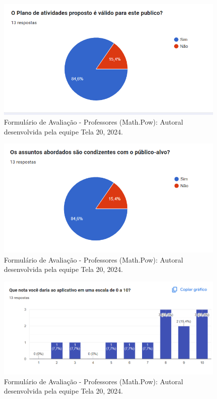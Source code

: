 \documentclass[12pt, openany, oneside, a4paper, english, brazil]{abntex2}   %
\begin{document}
\begin{figure}
    \centering
    \includegraphics{figuras/Formulário Gráficos/Professores/8 O plano de atividades proposto e valido.png}
    \caption{Formulário de Avaliação - Professores (Math.Pow):  Autoral desenvolvida pela equipe Tela 20, 2024.}
    \label{gráfico gerado pelo formulário}
\end{figure}


\begin{figure}
    \centering
    \includegraphics{figuras/Formulário Gráficos/Professores/9 Os assuntos abordados sao condizentes com o publico-alvo.png}
    \caption{Formulário de Avaliação - Professores (Math.Pow):  Autoral desenvolvida pela equipe Tela 20, 2024.}
    \label{gráfico gerado pelo formulário}
\end{figure}

\begin{figure}
    \centering
    \includegraphics[width=0.9\linewidth]{figuras/Formulário Gráficos/Professores/10 Que nota voce daria.png}
    \caption{Formulário de Avaliação - Professores (Math.Pow):  Autoral desenvolvida pela equipe Tela 20, 2024.}
    \label{gráfico gerado pelo formulário}
\end{figure}
\end{document}
